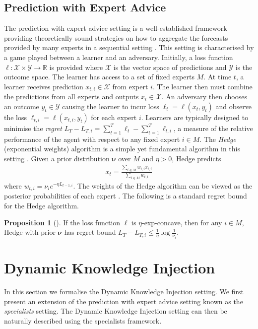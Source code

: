 \documentclass[letterpaper]{article} %
\newcommand {\R}{\mathbb{R}}
\theoremstyle{definition}
\newtheorem{prop}{Proposition}
\begin{document}
\subsection{Prediction with Expert Advice}
The prediction with expert advice setting is a well-established framework providing theoretically sound strategies on how to aggregate the forecasts provided by many experts in a sequential setting \cite{cesa2006prediction}. This setting is characterised by a game played between a learner and an adversary. Initially, a loss function $\ell: \mathcal{X} \times \mathcal{Y} \to \R$ is provided where $\mathcal{X}$ is the vector space of predictions and $\mathcal{Y}$ is the outcome space. The learner has access to a set of fixed experts $M$. At time $t$, a learner receives prediction $x_{t, i} \in \mathcal{X}$ from expert $i$. The learner then must combine the predictions from all experts and outputs $x_t \in \mathcal{X}$. An adversary then chooses an outcome $y_t \in \mathcal{Y}$ causing the learner to incur loss $\ell_t = \ell(x_t, y_t)$ and observe the loss $\ell_{t, i} = \ell(x_{t, i}, y_t)$ for each expert $i$. Learners are typically designed to minimise the \textit{regret} $L_T - L_{T, i} = \sum_{t=1}^{T} \ell_{t} - \sum_{t=1}^{T} \ell_{t, i}$, a measure of the relative performance of the agent with respect to any fixed expert $i \in M$. 
The \textit{Hedge} (exponential weights) algorithm is a simple yet fundamental algorithm 
in this setting \cite{cesa2006prediction, Vovk98}. Given a prior distribution $\bm{\nu}$ over $M$ and $\eta > 0$, Hedge predicts 
\begin{align*}
    x_t = \frac{\sum_{i \in M} w_{t, i} x_{t, i}}{\sum_{i \in M} w_{t, i}}
\end{align*}
where $w_{t, i} = \nu_i e^{- \eta L_{t-1, i}}$. The weights of the Hedge algorithm can be viewed as the posterior probabilities of each expert \cite{Jordan1995WhyTL}. The following is a standard regret bound for the Hedge algorithm.

\begin{prop}[\cite{cesa2006prediction}]
\label{prop:hedge_regret}
If the loss function $\ell$ is $\eta$-exp-concave, then for any $i \in M$, Hedge with prior $\bm{\nu}$ has regret bound $L_T - L_{T, i} \leq \frac{1}{\eta} \log \frac{1}{\nu_i}.$
\end{prop}


\section{Dynamic Knowledge Injection}
In this section we formalise the Dynamic Knowledge Injection setting. We first present an extension of the prediction with expert advice setting known as the \textit{specialists} setting. The Dynamic Knowledge Injection setting can then be naturally described using the specialists framework.
\end{document}
